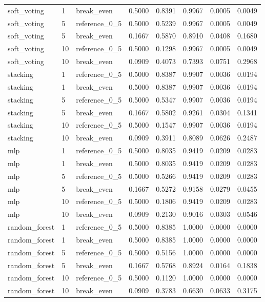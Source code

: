 \begin{longtable}{llllllll}
soft\_voting & 1 & break\_even & 0.5000 & 0.8391 & 0.9967 & 0.0005 & 0.0049 \\
soft\_voting & 5 & reference\_0\_5 & 0.5000 & 0.5239 & 0.9967 & 0.0005 & 0.0049 \\
soft\_voting & 5 & break\_even & 0.1667 & 0.5870 & 0.8910 & 0.0408 & 0.1680 \\
soft\_voting & 10 & reference\_0\_5 & 0.5000 & 0.1298 & 0.9967 & 0.0005 & 0.0049 \\
soft\_voting & 10 & break\_even & 0.0909 & 0.4073 & 0.7393 & 0.0751 & 0.2968 \\
stacking & 1 & reference\_0\_5 & 0.5000 & 0.8387 & 0.9907 & 0.0036 & 0.0194 \\
stacking & 1 & break\_even & 0.5000 & 0.8387 & 0.9907 & 0.0036 & 0.0194 \\
stacking & 5 & reference\_0\_5 & 0.5000 & 0.5347 & 0.9907 & 0.0036 & 0.0194 \\
stacking & 5 & break\_even & 0.1667 & 0.5802 & 0.9261 & 0.0304 & 0.1341 \\
stacking & 10 & reference\_0\_5 & 0.5000 & 0.1547 & 0.9907 & 0.0036 & 0.0194 \\
stacking & 10 & break\_even & 0.0909 & 0.3911 & 0.8089 & 0.0626 & 0.2487 \\
mlp & 1 & reference\_0\_5 & 0.5000 & 0.8035 & 0.9419 & 0.0209 & 0.0283 \\
mlp & 1 & break\_even & 0.5000 & 0.8035 & 0.9419 & 0.0209 & 0.0283 \\
mlp & 5 & reference\_0\_5 & 0.5000 & 0.5266 & 0.9419 & 0.0209 & 0.0283 \\
mlp & 5 & break\_even & 0.1667 & 0.5272 & 0.9158 & 0.0279 & 0.0455 \\
mlp & 10 & reference\_0\_5 & 0.5000 & 0.1806 & 0.9419 & 0.0209 & 0.0283 \\
mlp & 10 & break\_even & 0.0909 & 0.2130 & 0.9016 & 0.0303 & 0.0546 \\
random\_forest & 1 & reference\_0\_5 & 0.5000 & 0.8385 & 1.0000 & 0.0000 & 0.0000 \\
random\_forest & 1 & break\_even & 0.5000 & 0.8385 & 1.0000 & 0.0000 & 0.0000 \\
random\_forest & 5 & reference\_0\_5 & 0.5000 & 0.5156 & 1.0000 & 0.0000 & 0.0000 \\
random\_forest & 5 & break\_even & 0.1667 & 0.5768 & 0.8924 & 0.0164 & 0.1838 \\
random\_forest & 10 & reference\_0\_5 & 0.5000 & 0.1120 & 1.0000 & 0.0000 & 0.0000 \\
random\_forest & 10 & break\_even & 0.0909 & 0.3783 & 0.6630 & 0.0633 & 0.3175 \\
\bottomrule
\end{longtable}
